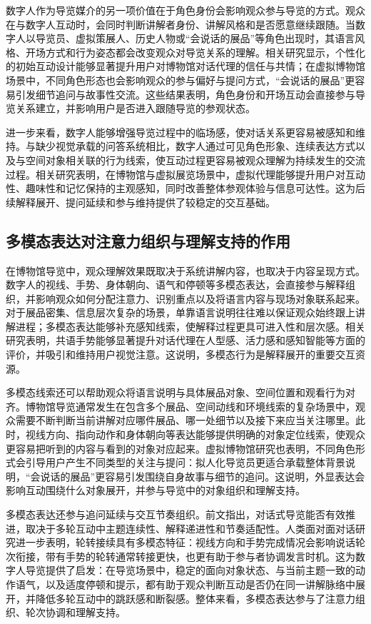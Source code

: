 数字人作为导览媒介的另一项价值在于角色身份会影响观众参与导览的方式。观众在与数字人互动时，会同时判断讲解者身份、讲解风格和是否愿意继续跟随。当数字人以导览员、虚拟策展人、历史人物或“会说话的展品”等角色出现时，其语言风格、开场方式和行为姿态都会改变观众对导览关系的理解。相关研究显示，个性化的初始互动设计能够显著提升用户对博物馆对话代理的信任与共情\cite{he2025icebreaking}；在虚拟博物馆场景中，不同角色形态也会影响观众的参与偏好与提问方式，“会说话的展品”更容易引发细节追问与故事性交流\cite{garcia2024speaking}。这些结果表明，角色身份和开场互动会直接参与导览关系建立，并影响用户是否进入跟随导览的参观状态。

进一步来看，数字人能够增强导览过程中的临场感，使对话关系更容易被感知和维持。与缺少视觉承载的问答系统相比，数字人通过可见角色形象、连续表达方式以及与空间对象相关联的行为线索，使互动过程更容易被观众理解为持续发生的交流过程。相关研究表明，在博物馆与虚拟展览场景中，虚拟代理能够提升用户对互动性、趣味性和记忆保持的主观感知，同时改善整体参观体验与信息可达性\cite{duguleana2020va,cao2021interactive}。这为后续解释展开、提问延续和参与维持提供了较稳定的交互基础。

\subsection{多模态表达对注意力组织与理解支持的作用}
在博物馆导览中，观众理解效果既取决于系统讲解内容，也取决于内容呈现方式。数字人的视线、手势、身体朝向、语气和停顿等多模态表达，会直接参与解释组织，并影响观众如何分配注意力、识别重点以及将语言内容与现场对象联系起来。对于展品密集、信息层次复杂的场景，单靠语言说明往往难以保证观众始终跟上讲解进程；多模态表达能够补充感知线索，使解释过程更具可进入性和层次感。相关研究表明，共语手势能够显著提升对话代理在人型感、活力感和感知智能等方面的评价，并吸引和维持用户视觉注意\cite{pereira2022cogesture}。这说明，多模态行为是解释展开的重要交互资源。

多模态线索还可以帮助观众将语言说明与具体展品对象、空间位置和观看行为对齐。博物馆导览通常发生在包含多个展品、空间动线和环境线索的复杂场景中，观众需要不断判断当前讲解对应哪件展品、哪一处细节以及接下来应当关注哪里。此时，视线方向、指向动作和身体朝向等表达能够提供明确的对象定位线索，使观众更容易把听到的内容与看到的对象对应起来。虚拟博物馆研究也表明，不同角色形式会引导用户产生不同类型的关注与提问：拟人化导览员更适合承载整体背景说明，“会说话的展品”更容易引发围绕自身故事与细节的追问\cite{garcia2024speaking}。这说明，外显表达会影响互动围绕什么对象展开，并参与导览中的对象组织和理解支持。

多模态表达还参与追问延续与交互节奏组织。前文指出，对话式导览能否有效推进，取决于多轮互动中主题连续性、解释递进性和节奏适配性。人类面对面对话研究进一步表明，轮转接续具有多模态特征：视线方向和手势完成情况会影响说话轮次衔接，带有手势的轮转通常转接更快，也更有助于参与者协调发言时机\cite{kendrick2023turntaking}。这为数字人导览提供了启发：在导览场景中，稳定的面向对象状态、与当前主题一致的动作语气，以及适度停顿和提示，都有助于观众判断互动是否仍在同一讲解脉络中展开，并降低多轮互动中的跳跃感和断裂感。整体来看，多模态表达参与了注意力组织、轮次协调和理解支持。

